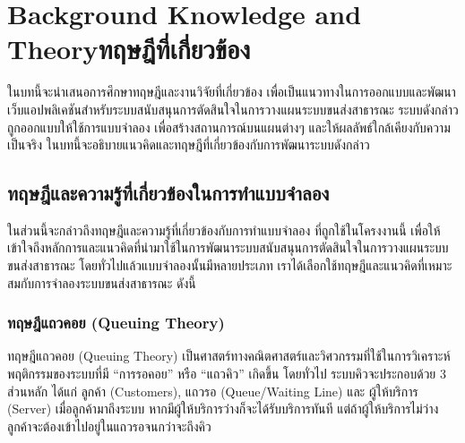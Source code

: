 \chapter{\ifenglish Background Knowledge and Theory\else ทฤษฎีที่เกี่ยวข้อง\fi}

\begin{mypara}
\indent ในบทนี้จะนำเสนอการศึกษาทฤษฎีและงานวิจัยที่เกี่ยวข้อง เพื่อเป็นแนวทางในการออกแบบและพัฒนาเว็บแอปพลิเคชันสำหรับระบบสนับสนุนการตัดสินใจในการวางแผนระบบขนส่งสาธารณะ 
    ระบบดังกล่าวถูกออกแบบให้ใช้การแบบจำลอง เพื่อสร้างสถานการณ์บนแผนต่างๆ 
    และให้ผลลัพธ์ใกล้เคียงกับความเป็นจริง ในบทนี้จะอธิบายแนวคิดและทฤษฎีที่เกี่ยวข้องกับการพัฒนาระบบดังกล่าว 
\end{mypara}

\section{ทฤษฎีและความรู้ที่เกี่ยวข้องในการทำแบบจำลอง}
    \begin{mypara}
        \indent ในส่วนนี้จะกล่าวถึงทฤษฎีและความรู้ที่เกี่ยวข้องกับการทำแบบจำลอง ที่ถูกใช้ในโครงงานนี้
        เพื่อให้เข้าใจถึงหลักการและแนวคิดที่นำมาใช้ในการพัฒนาระบบสนับสนุนการตัดสินใจในการวางแผนระบบขนส่งสาธารณะ
        โดยทั่วไปแล้วแบบจำลองนั้นมีหลายประเภท เราได้เลือกใช้ทฤษฎีและแนวคิดที่เหมาะสมกับการจำลองระบบขนส่งสาธารณะ ดังนี้
    \end{mypara}

\subsection{ทฤษฎีแถวคอย (Queuing Theory)}
\begin{mypara}
    \indent ทฤษฎีแถวคอย (Queuing Theory) เป็นศาสตร์ทางคณิตศาสตร์และวิศวกรรมที่ใช้ในการวิเคราะห์พฤติกรรมของระบบที่มี 
    “การรอคอย” หรือ “แถวคิว” เกิดขึ้น โดยทั่วไป ระบบคิวจะประกอบด้วย 3 ส่วนหลัก ได้แก่ ลูกค้า (Customers), 
    แถวรอ (Queue/Waiting Line) และ ผู้ให้บริการ (Server) เมื่อลูกค้ามาถึงระบบ หากมีผู้ให้บริการว่างก็จะได้รับบริการทันที 
    แต่ถ้าผู้ให้บริการไม่ว่าง ลูกค้าจะต้องเข้าไปอยู่ในแถวรอจนกว่าจะถึงคิว
\end{mypara}

